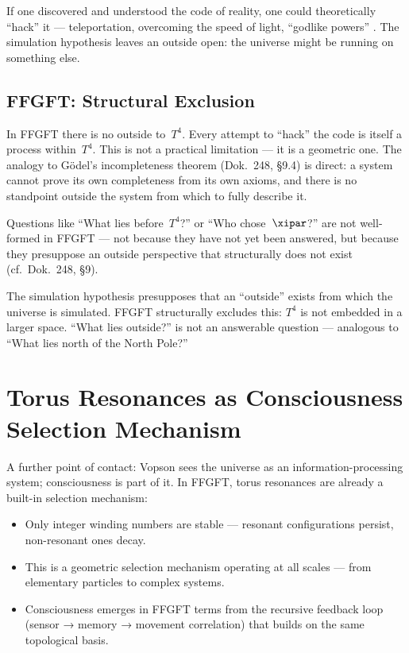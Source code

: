 If one discovered and understood the code of reality, one could theoretically
``hack'' it --- teleportation, overcoming the speed of light, ``godlike powers''
\cite{Vopson2024}. The simulation hypothesis leaves an outside open: the
universe might be running on something else.

\subsection{FFGFT: Structural Exclusion}

In FFGFT there is no outside to~$T^4$. Every attempt to ``hack'' the code is
itself a process within~$T^4$. This is not a practical limitation --- it is a
geometric one. The analogy to Gödel's incompleteness theorem (Dok.~248, §9.4)
is direct: a system cannot prove its own completeness from its own axioms, and
there is no standpoint outside the system from which to fully describe it.

Questions like ``What lies before~$T^4$?'' or ``Who chose~$\xipar$?'' are not
well-formed in FFGFT --- not because they have not yet been answered, but
because they presuppose an outside perspective that structurally does not exist
(cf.\ Dok.~248, §9).

\begin{wichtig}
The simulation hypothesis presupposes that an ``outside'' exists from which
the universe is simulated. FFGFT structurally excludes this: $T^4$ is not
embedded in a larger space. ``What lies outside?'' is not an answerable
question --- analogous to ``What lies north of the North Pole?''
\end{wichtig}

\section{Torus Resonances as Consciousness Selection Mechanism}

A further point of contact: Vopson sees the universe as an information-processing
system; consciousness is part of it. In FFGFT, torus resonances are already a
built-in selection mechanism:

\begin{itemize}
  \item Only integer winding numbers are stable --- resonant configurations
    persist, non-resonant ones decay.
  \item This is a geometric selection mechanism operating at all scales ---
    from elementary particles to complex systems.
  \item Consciousness emerges in FFGFT terms from the recursive feedback loop
    (sensor → memory → movement correlation) that builds on the same
    topological basis.
\end{itemize}

